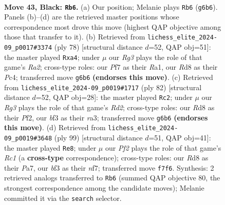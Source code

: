 \documentclass[11pt]{article}
\begin{document}
\clearpage

\begin{figure}[p]\centering
\begin{subfigure}{0.46\textwidth}\centering
\resizebox{\linewidth}{!}{%
\newchessgame
\chessboard[
  setfen={3r2k1/5p1p/6r1/pb6/3p2P1/1P3B1N/3K2RP/2R5 b - - 1 43},
  showmover=false,
  pgfstyle=straightmove, color=movearrow, markmove={g6-b6}
]}
\caption{}
\end{subfigure}\hfill
\begin{subfigure}{0.46\textwidth}\centering
\resizebox{\linewidth}{!}{%
\newchessgame
\chessboard[
  setfen={r1r5/4kp2/2P3p1/4p1P1/p1P5/5PK1/R2B4/R7 w - - 1 40},
  showmover=false,
  pgfstyle=straightmove, color=movearrow, markmove={a2-a4}
]}
\caption{}
\end{subfigure}
\\[4pt]
\begin{subfigure}{0.46\textwidth}\centering
\resizebox{\linewidth}{!}{%
\newchessgame
\chessboard[
  setfen={r5k1/6p1/7p/8/2p5/r1P4P/p2R1PP1/R4K2 w - - 6 42},
  showmover=false,
  pgfstyle=straightmove, color=movearrow, markmove={d2-c2}
]}
\caption{}
\end{subfigure}\hfill
\begin{subfigure}{0.46\textwidth}\centering
\resizebox{\linewidth}{!}{%
\newchessgame
\chessboard[
  setfen={2r5/p1r1PN2/k7/1p4P1/8/8/P1p2K1P/2B1R3 b - - 2 50},
  showmover=false,
  pgfstyle=straightmove, color=movearrow, markmove={c8-e8}
]}
\caption{}
\end{subfigure}
\caption{\textbf{Move 43, Black: \texttt{Rb6}.} (a) Our position; Melanie plays \texttt{Rb6} (\texttt{g6b6}). Panels (b)--(d) are the retrieved master positions whose correspondence most drove this move (highest QAP objective among those that transfer to it). (b) Retrieved from \texttt{lichess\_elite\_2024-09\_p0017\#3374} (ply 78) [structural distance $d$=52, QAP obj=51]: the master played \texttt{Rxa4}; under $\mu$ our \emph{Rg3} plays the role of that game's \emph{Ra2}; cross-type roles: our \emph{P}f7 as their \emph{R}a1, our \emph{R}d8 as their \emph{P}c4; transferred move \texttt{g6b6} \textbf{(endorses this move)}. (c) Retrieved from \texttt{lichess\_elite\_2024-09\_p0019\#1717} (ply 82) [structural distance $d$=52, QAP obj=28]: the master played \texttt{Rc2}; under $\mu$ our \emph{Rg3} plays the role of that game's \emph{Rd2}; cross-type roles: our \emph{R}d8 as their \emph{P}f2, our \emph{b}f3 as their \emph{r}a3; transferred move \texttt{g6b6} \textbf{(endorses this move)}. (d) Retrieved from \texttt{lichess\_elite\_2024-09\_p0019\#3648} (ply 99) [structural distance $d$=51, QAP obj=41]: the master played \texttt{Re8}; under $\mu$ our \emph{Pf2} plays the role of that game's \emph{Rc1} (a \textbf{cross-type} correspondence); cross-type roles: our \emph{R}d8 as their \emph{P}a7, our \emph{b}f3 as their \emph{n}f7; transferred move \texttt{f7f6}. Synthesis: 2 retrieved analogs transferred to \texttt{Rb6} (summed QAP objective 80, the strongest correspondence among the candidate moves); Melanie committed it via the \texttt{search} selector.}
\label{fig:thought-m85}
\end{figure}
\end{document}
